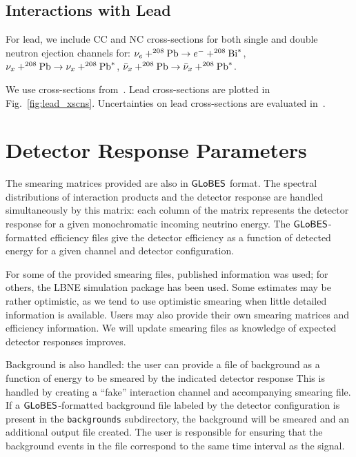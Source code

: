 \documentclass[12pt]{article}
\newcommand{\globes}{\sf{GLoBES}}
\begin{document}
\subsection{Interactions with Lead}

For lead, we include 
CC and NC cross-sections for both single and double
neutron ejection channels for:
$\nu_e + ^{208}{\rm Pb} \rightarrow e^- + ^{208}{\rm Bi}^{*}$, 
$\nu_x + ^{208}{\rm Pb} \rightarrow \nu_x + ^{208}{\rm Pb}^{*}$, 
$\bar{\nu}_x + ^{208}{\rm Pb} \rightarrow \bar{\nu}_x + ^{208}{\rm Pb}^{*}$.

We use cross-sections from~\cite{Engel:2002hg}.
Lead cross-sections are plotted in Fig.~\ref{fig:lead_xscns}.  Uncertainties on lead cross-sections are evaluated in~\cite{Paar:2011pz}.

\section{Detector Response Parameters}\label{response}

The smearing matrices provided are also in $\globes$ format.  The
spectral distributions of interaction products and the detector
response are handled simultaneously by this matrix: each column of the
matrix represents the detector response for a given monochromatic
incoming neutrino energy.  The $\globes$-formatted efficiency files give the
detector efficiency as a function of detected energy for a given channel and detector configuration.  

For some of the provided smearing files, published information was
used; for others, the LBNE simulation package has been used.  Some
estimates may be rather optimistic, as we tend to use optimistic
smearing when little detailed information is available.  Users may
also provide their own smearing matrices and efficiency information.
We will update smearing files as knowledge of
expected detector responses improves.

Background is also handled: the user can provide a file of background as a function of energy to be smeared by the indicated detector response
This is handled by creating a ``fake'' interaction channel and accompanying smearing file.  If a $\globes$-formatted background file labeled by the detector configuration is present in the \texttt{backgrounds} subdirectory, the background will be smeared and an additional output file created.  The user is responsible for 
ensuring that the background events in the file correspond to the same time interval as the signal.
\end{document}
